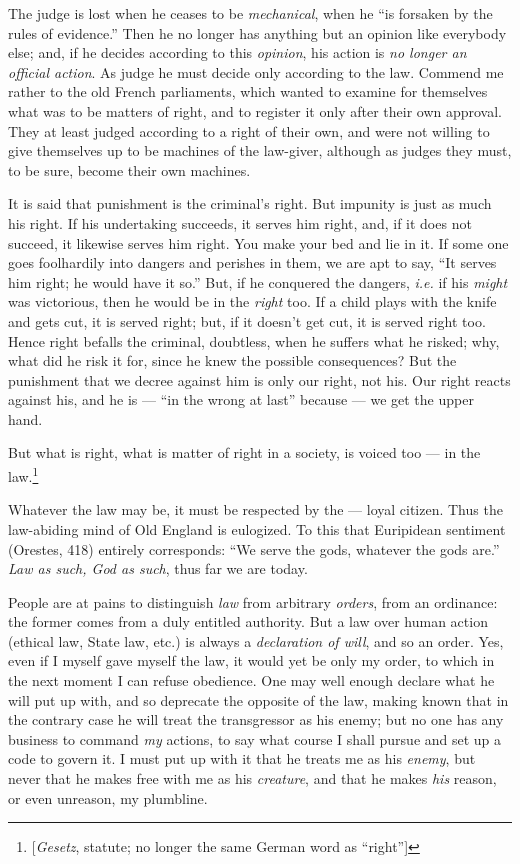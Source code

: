 The judge is lost when he ceases to be \textit{mechanical}, when he ``is 
forsaken by the rules of evidence.'' Then he no longer has anything but an 
opinion like everybody else; and, if he decides according to this 
\textit{opinion}, his action is \textit{no longer an official action}. As 
judge he must decide only according to the law. Commend me rather to the old 
French parliaments, which wanted to examine for themselves what was to be 
matters of right, and to register it only after their own approval. They at 
least judged according to a right of their own, and were not willing to give 
themselves up to be machines of the law-giver, although as judges they must, 
to be sure, become their own machines.

It is said that punishment is the criminal's right. But impunity is just as 
much his right. If his undertaking succeeds, it serves him right, and, if it 
does not succeed, it likewise serves him right. You make your bed and lie in 
it. If some one goes foolhardily into dangers and perishes in them, we are apt 
to say, ``It serves him right; he would have it so.'' But, if he conquered 
the dangers, \textit{i.e.} if his \textit{might} was victorious, then he would 
be in the \textit{right} too. If a child plays with the knife and gets cut, it 
is served right; but, if it doesn't get cut, it is served right too. Hence 
right befalls the criminal, doubtless, when he suffers what he risked; why, 
what did he risk it for, since he knew the possible consequences? But the 
punishment that we decree against him is only our right, not his. Our right 
reacts against his, and he is --- ``in the wrong at last'' because --- we get 
the upper hand.

\myhrule


But what is right, what is matter of right in a society, is voiced too --- in 
the law.\footnote{[\textit{Gesetz}, statute; no longer the same German word as 
``right'']}

Whatever the law may be, it must be respected by the --- loyal citizen. Thus 
the law-abiding mind of Old England is eulogized. To this that Euripidean 
sentiment (Orestes, 418) entirely corresponds: ``We serve the gods, whatever 
the gods are.'' \textit{Law as such, God as such}, thus far we are today.

People are at pains to distinguish \textit{law} from arbitrary \textit{orders}, 
from an ordinance: the former comes from a duly entitled authority. But a law 
over human action (ethical law, State law, etc.) is always a 
\textit{declaration of will}, and so an order. Yes, even if I myself gave 
myself the law, it would yet be only my order, to which in the next moment I 
can refuse obedience. One may well enough declare what he will put up with, 
and so deprecate the opposite of the law, making known that in the contrary 
case he will treat the transgressor as his enemy; but no one has any business 
to command \textit{my} actions, to say what course I shall pursue and set up a 
code to govern it. I must put up with it that he treats me as his 
\textit{enemy}, but never that he makes free with me as his \textit{creature}, 
and that he makes \textit{his} reason, or even unreason, my plumbline.

